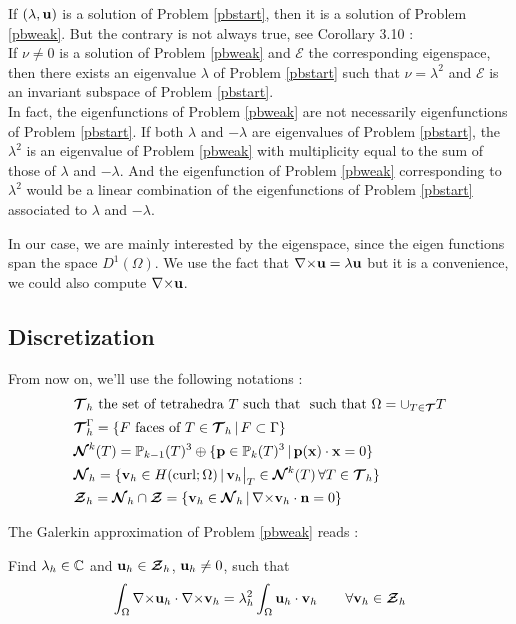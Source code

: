 If $(\lambda,{\mathbf{u}})$ is a solution of Problem \ref{pbstart}, then it is a
solution of Problem \ref{pbweak}. But the contrary is not always true,
see \cite{Venegas2013} Corollary 3.10 :\\

If $\nu\ne 0$ is a solution of Problem \ref{pbweak} and $\bm{\mathcal{E}}$ the
corresponding eigenspace, then there exists an eigenvalue $\lambda$ of
Problem \ref{pbstart} such that $\nu=\lambda^2$ and $\bm{\mathcal{E}}$ is an
invariant subspace of Problem \ref{pbstart}.\\

In fact, the eigenfunctions of Problem \ref{pbweak} are not necessarily
eigenfunctions of Problem \ref{pbstart}. If both $\lambda$ and $-\lambda$
are eigenvalues of Problem \ref{pbstart}, the $\lambda^2$ is an eigenvalue
of Problem \ref{pbweak} with multiplicity equal to the sum of those of
$\lambda$ and $-\lambda$. And the eigenfunction of Problem \ref{pbweak}
corresponding to $\lambda^2$ would be a linear combination of the
eigenfunctions of Problem \ref{pbstart} associated to $\lambda$ and
$-\lambda$.\\

\begin{rk}
In our case, we are mainly interested by the eigenspace, since the
eigen functions span the space $D^1(\Omega)$. We use the fact that
${\nabla\times}{\mathbf{u}}=\lambda{\mathbf{u}}$ but it is a convenience, we could
also compute ${\nabla\times}{\mathbf{u}}$.
\end{rk}

\subsection{Discretization}
From now on, we'll use the following notations :
\begin{align*}
&{\bm{\mathcal{T}}}_h\mbox{ the set of tetrahedra } T \mbox{ such that }
\mbox{ such that } \Omega=\cup_{T\in{\bm{\mathcal{T}}}}T\\
&{\bm{\mathcal{T}}}_h^\Gamma =\{F\mbox{ faces of } T\in {\bm{\mathcal{T}}}_h \,|\, F\subset \Gamma
\}\\
&{\bm{\mathcal{N}}}^k(T)={\mathbb{P}}_{k-1}(T)^3\oplus\{{\mathbf{p}}\in{\mathbb{P}}_k(T)^3 \,|\,
{\mathbf{p(x)}}\cdot{\mathbf{x}}=0 \}\\
&{\bm{\mathcal{N}}}_h=\{{\mathbf{v}}_h\in H(\mathrm{curl};\Omega) \,|\,
{\mathbf{v}}_h{\big\rvert_{T}}\in{\bm{\mathcal{N}}}^k(T)\, \forall T\in {\bm{\mathcal{T}}}_h \}\\
&{\bm{\mathcal{Z}}}_h={\bm{\mathcal{N}}}_h\cap{\bm{\mathcal{Z}}}=\{{\mathbf{v}}_h\in{\bm{\mathcal{N}}}_h \,|\,
{\nabla\times}{\mathbf{v}}_h\cdot{\mathbf{n}} = 0 \}
\end{align*}

The Galerkin approximation of Problem \ref{pbweak} reads :
\begin{pb}\label{pbdiscr}
Find $\lambda_h\in{\mathbb{C}}$ and ${\mathbf{u}}_h\in{\bm{\mathcal{Z}}}_h$, ${\mathbf{u}}_h\ne
0$, such that
\[\int_\Omega {\nabla\times}{\mathbf{u}}_h\cdot{\nabla\times}{\mathbf{v}}_h =
\lambda_h^2\int_\Omega {\mathbf{u}}_h\cdot{\mathbf{v}}_h \quad\quad
\forall{\mathbf{v}}_h\in{\bm{\mathcal{Z}}}_h \]
\end{pb}

